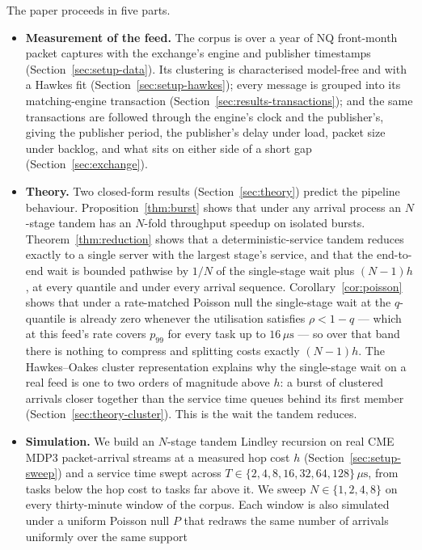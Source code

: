 \documentclass[11pt]{article}
\begin{document}
The paper proceeds in five parts.

\begin{itemize}
    \item \textbf{Measurement of the feed.} The corpus is over a year of NQ front-month
packet captures with the exchange's engine and publisher timestamps
(Section~\ref{sec:setup-data}). Its clustering is characterised model-free and with a
Hawkes fit (Section~\ref{sec:setup-hawkes}); every message is grouped into its
matching-engine transaction (Section~\ref{sec:results-transactions}); and the same
transactions are followed through the engine's clock and the publisher's, giving the
publisher period, the publisher's delay under load, packet size under backlog, and what
sits on either side of a short gap (Section~\ref{sec:exchange}).
    \item \textbf{Theory.} Two closed-form results (Section~\ref{sec:theory}) predict the
pipeline behaviour. Proposition~\ref{thm:burst} shows that under any arrival process an
$N$-stage tandem has an $N$-fold throughput speedup on isolated bursts.
Theorem~\ref{thm:reduction} shows that a deterministic-service tandem reduces exactly to a
single server with the largest stage's service, and that the end-to-end wait is bounded
pathwise by $1/N$ of the single-stage wait plus $(N-1)h$, at every quantile and under
every arrival sequence. Corollary~\ref{cor:poisson} shows that under a rate-matched
Poisson null the single-stage wait at the $q$-quantile is already zero whenever the
utilisation satisfies $\rho < 1 - q$ --- which at this feed's rate covers $p_{99}$ for
every task up to $16\,\mu\mathrm{s}$ --- so over that band there is nothing to compress
and splitting costs exactly $(N-1)h$. The Hawkes--Oakes cluster representation explains why the single-stage wait on a real
feed is one to two orders of magnitude above $h$: a burst of clustered arrivals closer
together than the service time queues behind its first member (Section~\ref{sec:theory-cluster}).
This is the wait the tandem reduces.
    \item \textbf{Simulation.} We build an $N$-stage tandem Lindley recursion on real CME
MDP3 packet-arrival streams at a measured hop cost $h$ (Section~\ref{sec:setup-sweep}) and a service
time swept across $T \in \{2, 4, 8, 16, 32, 64, 128\}\,\mu\mathrm{s}$, from tasks below
the hop cost to tasks far above it. We sweep $N \in \{1, 2, 4, 8\}$ on every thirty-minute window of the corpus. Each window is also simulated under a uniform
Poisson null $P$ that redraws the same number of arrivals uniformly over the same support

\end{itemize}
\end{document}
